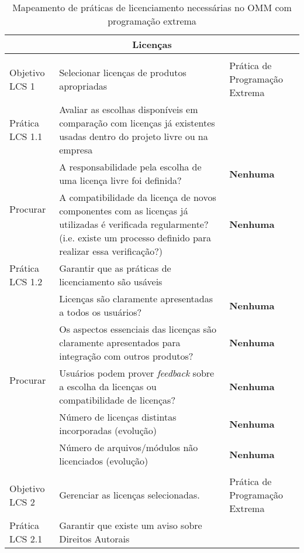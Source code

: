 \begin{longtable}{|p{2cm}|p{7cm}|p{7cm}|}
  \caption{Mapeamento de práticas de licenciamento necessárias
    no OMM com programação extrema} \\
  \multicolumn{3}{|c|}{\cellcolor[gray]{0.6} Licenças}\\
  \endhead
  & & \\
  \hline \cellcolor[gray]{0.6} Objetivo LCS 1 & \cellcolor[gray]{0.6}
  Selecionar licenças de produtos apropriadas & Prática de Programação Extrema \\
  \hline \cellcolor[gray]{0.9} Prática LCS 1.1 & \cellcolor[gray]{0.9}
  Avaliar as escolhas disponíveis em comparação com licenças já
  existentes usadas dentro do projeto livre ou na empresa & \\
  \hline \multirow{2}{*}{Procurar} & A responsabilidade pela escolha
  de
  uma licença livre foi definida? &\textbf{Nenhuma} \\
  \cline{2-3} & A compatibilidade da licença de novos componentes com
  as licenças já utilizadas é verificada regularmente? (i.e. existe um
  processo definido para realizar essa verificação?) &\textbf{Nenhuma} \\
  \hline \cellcolor[gray]{0.9} Prática LCS 1.2 & \cellcolor[gray]{0.9}
  Garantir que as práticas de licenciamento são usáveis & \\
  \hline \multirow{5}{*}{Procurar} & Licenças são claramente
  apresentadas a todos os usuários?  & \textbf{Nenhuma} \\
  \cline{2-3} & Os aspectos essenciais das licenças são claramente
  apresentados para integração com outros produtos? & \textbf{Nenhuma} \\
  \cline{2-3} & Usuários podem prover \textit{feedback} sobre a
  escolha da licenças ou compatibilidade de licenças? & \textbf{Nenhuma} \\
  \cline{2-3} & Número de licenças distintas incorporadas (evolução) &
  \textbf{Nenhuma} \\
  \cline{2-3} & Número de arquivos/módulos não licenciados (evolução)
  & \textbf{Nenhuma} \\
  \hline
  & & \\
  \hline \cellcolor[gray]{0.6} Objetivo LCS 2 & \cellcolor[gray]{0.6}
  Gerenciar as licenças selecionadas. & Prática de Programação Extrema \\
  \hline \cellcolor[gray]{0.9} Prática LCS 2.1 & \cellcolor[gray]{0.9}
  Garantir que existe um aviso sobre Direitos Autorais & \\

\end{longtable}
